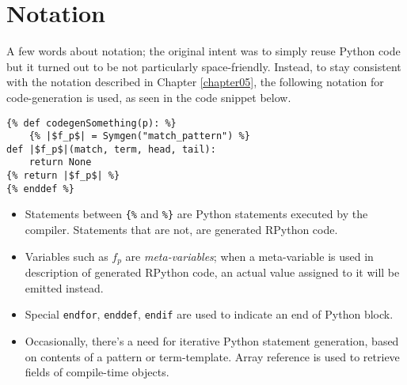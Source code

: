 \section{Notation}

A few words about notation; the original intent was to simply reuse Python code but it turned out to be not particularly space-friendly. Instead, to stay consistent with the notation described in Chapter \ref{chapter05}, the following notation for code-generation is used, as seen in the code snippet below.


\begin{verbatim}
{% def codegenSomething(p): %}
	{% |$f_p$| = Symgen("match_pattern") %}
def |$f_p$|(match, term, head, tail):
	return None
{% return |$f_p$| %}
{% enddef %}
\end{verbatim}

\begin{itemize}
\item Statements between \texttt{\{\%} and \texttt{\%\}} are Python statements executed by the compiler. Statements that are not, are generated RPython code.
\item Variables such as $f_p$ are \textit{meta-variables}; when a meta-variable is used in description of generated RPython code, an actual value assigned to it will be emitted instead.
\item Special \texttt{endfor}, \texttt{enddef}, \texttt{endif} are used to indicate an end of Python block.
\item Occasionally, there's a need for iterative Python statement generation, based on contents of a pattern or term-template. Array reference is used to retrieve fields of compile-time objects.

\end{itemize}
